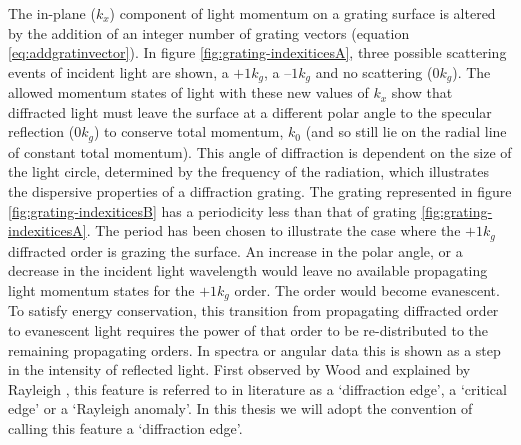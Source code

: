 The in-plane ($k_x$) component of light momentum on a grating surface is altered by the addition of an integer number of grating vectors (equation \ref{eq:addgratinvector}).  In figure \ref{fig:grating-indexiticesA}, three possible scattering events of incident light are shown, a $+1k_g$, a $–1k_g$ and no scattering ($0k_g$).  The allowed momentum states of light with these new values of $k_x$ show that diffracted light must leave the surface at a different polar angle to the specular reflection ($0k_g$) to conserve total momentum, $k_0$ (and so still lie on the radial line of constant total momentum). This angle of diffraction is dependent on the size of the light circle, determined by the frequency of the radiation, which illustrates the dispersive properties of a diffraction grating.
The grating represented in figure \ref{fig:grating-indexiticesB} has a periodicity less than that of grating \ref{fig:grating-indexiticesA}. The period has been chosen to illustrate the case where the $+1k_g$ diffracted order is grazing the surface. An increase in the polar angle, or a decrease in the incident light wavelength would leave no available propagating light momentum states for the $+1k_g$ order. The order would become evanescent. To satisfy energy conservation, this transition from propagating diffracted order to evanescent light requires the power of that order to be re-distributed to the remaining propagating orders. In spectra or angular data this is shown as a step in the intensity of reflected light. First observed by Wood \cite{Light} and explained by Rayleigh \cite{Rayleigh1907a}, this feature is referred to in literature as a ‘diffraction edge’, a ‘critical edge’ or a ‘Rayleigh anomaly’.  In this thesis we will adopt the convention of calling this feature a ‘diffraction edge’.

